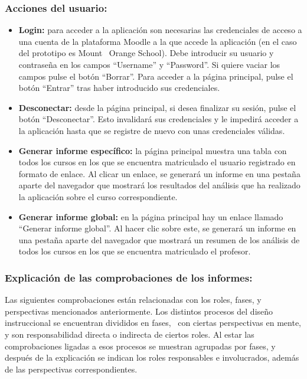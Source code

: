 \subsubsection{Acciones del usuario:}

\begin{itemize}
	\item
	\textbf{Login:} para acceder a la aplicación son necesarias las
	credenciales de acceso a una cuenta de la plataforma Moodle a la que
	accede la aplicación (en el caso del prototipo es Mount ~Orange
	School). Debe introducir su usuario y contraseña en los campos
	``Username'' y ``Password''. Si quiere vaciar los campos pulse el botón
	``Borrar''. Para acceder a la página principal, pulse el botón ``Entrar''
	tras haber introducido sus credenciales.
	\item
	\textbf{Desconectar:} desde la página principal, si desea finalizar su
	sesión, pulse el botón ``Desconectar''. Esto invalidará sus credenciales
	y le impedirá acceder a la aplicación hasta que se registre de nuevo
	con unas credenciales válidas.
	\item
	\textbf{Generar informe específico:} la página principal muestra una
	tabla con todos los cursos en los que se encuentra matriculado el
	usuario registrado en formato de enlace. Al clicar un enlace, se
	generará un informe en una pestaña aparte del navegador que mostrará
	los resultados del análisis que ha realizado la aplicación sobre el
	curso correspondiente.
	\item
	\textbf{Generar informe global:} en la página principal hay un enlace
	llamado ``Generar informe global''. Al hacer clic sobre este, se
	generará un informe en una pestaña aparte del navegador que mostrará
	un resumen de los análisis de todos los cursos en los que se encuentra
	matriculado el profesor.
\end{itemize}

\subsubsection{Explicación de las comprobaciones de los informes:}

Las siguientes comprobaciones están relacionadas con los roles, fases, y
perspectivas mencionados anteriormente. Los distintos procesos del
diseño instruccional se encuentran divididos en fases, ~con ciertas
perspectivas en mente, y son responsabilidad directa o indirecta de
ciertos roles. Al estar las comprobaciones ligadas a esos procesos se
muestran agrupadas por fases, y después de la explicación se indican los
roles responsables e involucrados, además de las perspectivas
correspondientes.


